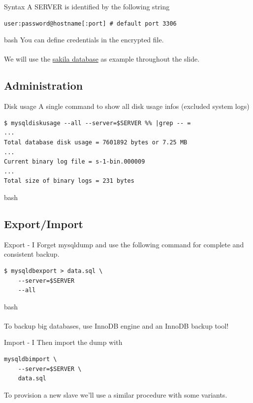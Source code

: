 \documentclass{beamer}[10]
\begin{document}
\begin{pyframe}{Syntax}
A SERVER is identified by the following string
\begin{verbatim}
user:password@hostname[:port] # default port 3306
\end{verbatim}{bash}
You can define credentials in the 
encrypted file.
\\\\
We will use the \href{http://dev.mysql.com/doc/index-other.html}
{sakila database} as example throughout
the slide.

\end{pyframe}

\subsection{Administration}
\begin{pyframe}{Disk usage}
A single command to show all disk usage infos (excluded system logs)

\begin{verbatim}
$ mysqldiskusage --all --server=$SERVER %% |grep -- =
...
Total database disk usage = 7601892 bytes or 7.25 MB
...
Current binary log file = s-1-bin.000009
...
Total size of binary logs = 231 bytes
\end{verbatim}{bash}
\end{pyframe}

%
%
\subsection{Export/Import}

\begin{pyframe}{Export - I}
Forget mysqldump and use the following
command for complete and consistent backup.
\begin{verbatim}
$ mysqldbexport > data.sql \
    --server=$SERVER
    --all
\end{verbatim}{bash}
\\\\
{
\large
To backup big databases, use InnoDB engine and an InnoDB backup tool!
}
\end{pyframe}


\begin{pyframe}{Import - I}
Then import the dump with
\begin{verbatim}
mysqldbimport \
    --server=$SERVER \
    data.sql
\end{verbatim}
To provision a new slave we'll use a similar
procedure with some variants.
\end{pyframe}
\end{document}

